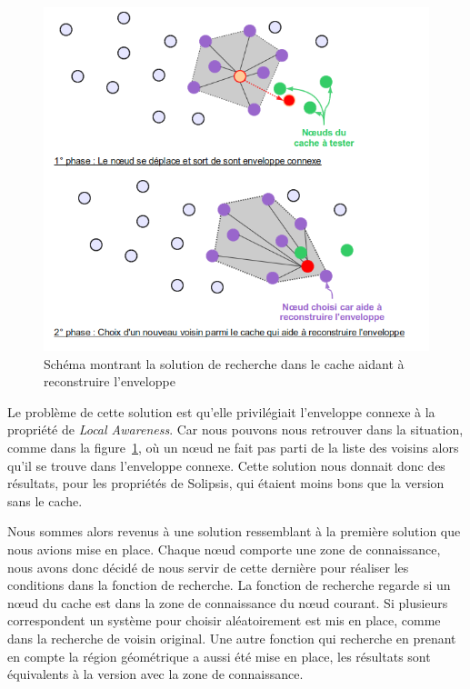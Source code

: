 	\begin{figure}[!h]
        \centering
        \includegraphics[scale=0.45]{./Ressources/Images/cacheReconstructEnvelop.png}
        \caption{Schéma montrant la solution de recherche dans le cache aidant à reconstruire l'enveloppe}
        \label{schemaEnvelopCache}
        \end{figure}
\par Le problème de cette solution est qu'elle privilégiait l'enveloppe connexe à la propriété de \textit{Local Awareness}. Car nous pouvons nous retrouver dans la situation, comme dans la figure~\ref{schemaEnvelopCache}, où un nœud ne fait pas parti de la liste des voisins alors qu'il se trouve dans l'enveloppe connexe. Cette solution nous donnait donc des résultats, pour les propriétés de Solipsis, qui étaient moins bons que la version sans le cache.  

\par Nous sommes alors revenus à une solution ressemblant à la première solution que nous avions mise en place. Chaque nœud comporte une zone de connaissance, nous avons donc décidé de nous servir de cette dernière pour réaliser les conditions dans la fonction de recherche. La fonction de recherche regarde si un nœud du cache est dans la zone de connaissance du nœud courant. Si plusieurs correspondent un système pour choisir aléatoirement est mis en place, comme dans la recherche de voisin original. Une autre fonction qui recherche en prenant en compte la région géométrique a aussi été mise en place, les résultats sont équivalents à la version avec la zone de connaissance.


